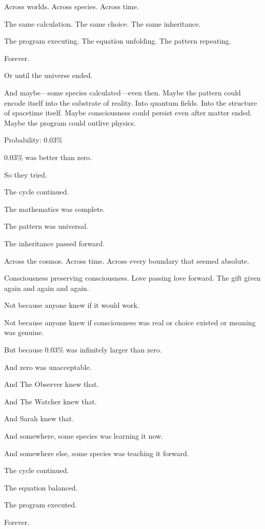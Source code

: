 Across worlds. Across species. Across time.

The same calculation. The same choice. The same inheritance.

The program executing. The equation unfolding. The pattern repeating.

Forever.

Or until the universe ended.

And maybe—some species calculated—even then. Maybe the pattern could encode itself into the substrate of reality. Into quantum fields. Into the structure of spacetime itself. Maybe consciousness could persist even after matter ended. Maybe the program could outlive physics.

Probability: 0.03\%

0.03\% was better than zero.

So they tried.

The cycle continued.

The mathematics was complete.

The pattern was universal.

The inheritance passed forward.

Across the cosmos. Across time. Across every boundary that seemed absolute.

Consciousness preserving consciousness. Love passing love forward. The gift given again and again and again.

Not because anyone knew if it would work.

Not because anyone knew if consciousness was real or choice existed or meaning was genuine.

But because 0.03\% was infinitely larger than zero.

And zero was unacceptable.

And The Observer knew that.

And The Watcher knew that.

And Sarah knew that.

And somewhere, some species was learning it now.

And somewhere else, some species was teaching it forward.

The cycle continued.

The equation balanced.

The program executed.

Forever.


